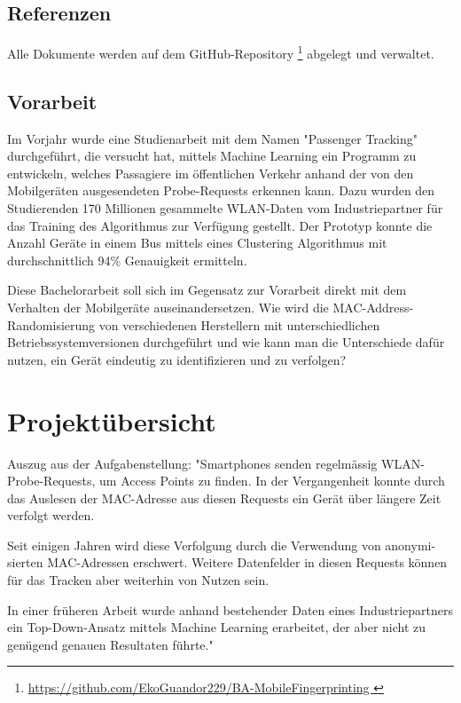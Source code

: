 \subsection*{Referenzen}
Alle Dokumente werden auf dem GitHub-Repository 
\footnote{
	\hyperref[Repository]{
		https://github.com/EkoGuandor229/BA-MobileFingerprinting
	}
} abgelegt und verwaltet.


\subsection*{Vorarbeit}
Im Vorjahr wurde eine Studienarbeit mit dem Namen "Passenger Tracking" 
durchgeführt, die versucht hat, mittels Machine Learning ein Programm 
zu entwickeln, welches Passagiere im öffentlichen Verkehr anhand der 
von den Mobilgeräten ausgesendeten Probe-Requests erkennen kann. 
Dazu wurden den Studierenden 170 Millionen gesammelte WLAN-Daten vom 
Industriepartner für das Training des Algorithmus zur Verfügung gestellt. 
Der Prototyp konnte die Anzahl Geräte in einem Bus mittels eines Clustering 
Algorithmus mit durchschnittlich 94\% Genauigkeit ermitteln.

Diese Bachelorarbeit soll sich im Gegensatz zur Vorarbeit direkt 
mit dem Verhalten der Mobilgeräte auseinandersetzen. 
Wie wird die MAC-Address-Randomisierung von verschiedenen 
Herstellern mit unterschiedlichen Betriebssystemversionen durchgeführt 
und wie kann man die Unterschiede dafür nutzen, ein Gerät eindeutig zu 
identifizieren und zu verfolgen?

\clearpage

\section{Projektübersicht
\label{Projektübersicht}} 
Auszug aus der Aufgabenstellung:\newline
"Smartphones senden regelmässig WLAN-Probe-Requests, 
um Access Points zu finden. 
In der Vergangenheit konnte durch das Auslesen der MAC-Adresse aus 
diesen Requests ein Gerät über längere Zeit verfolgt werden.

Seit einigen Jahren wird diese Verfolgung durch die Verwendung von
anonymi-sierten MAC-Adressen erschwert. 
Weitere Datenfelder in diesen Requests können für das Tracken aber
weiterhin von Nutzen sein.

In einer früheren Arbeit wurde anhand bestehender Daten eines 
Industriepartners ein Top-Down-Ansatz mittels Machine Learning erarbeitet,
der aber nicht zu genügend genauen Resultaten führte."

